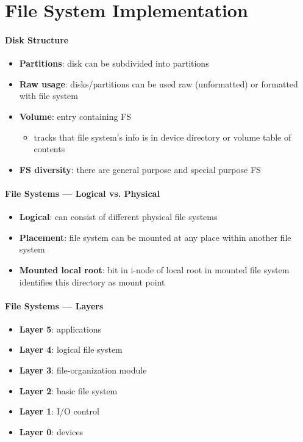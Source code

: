 \section{File System Implementation}

\paragraph{Disk Structure}
\begin{itemize}
  \item \textbf{Partitions}: disk can be subdivided into partitions
  \item \textbf{Raw usage}: disks/partitions can be used raw (unformatted) or formatted with file system
  \item \textbf{Volume}: entry containing FS
  \begin{itemize}
    \item tracks that file system's info is in device directory or volume table of contents
  \end{itemize}
  \item \textbf{FS diversity}: there are general purpose and special purpose FS
\end{itemize}

\paragraph{File Systems --- Logical vs. Physical}
\begin{itemize}
  \item \textbf{Logical}: can consist of different physical file systems
  \item \textbf{Placement}: file system can be mounted at any place within another file system
  \item \textbf{Mounted local root}: bit in i-node of local root in mounted file system identifies this directory as mount point
\end{itemize}

\paragraph{File Systems --- Layers}
\begin{itemize}
  \item \textbf{Layer 5}: applications
  \item \textbf{Layer 4}: logical file system
  \item \textbf{Layer 3}: file-organization module
  \item \textbf{Layer 2}: basic file system
  \item \textbf{Layer 1}: I/O control
  \item \textbf{Layer 0}: devices
\end{itemize}

